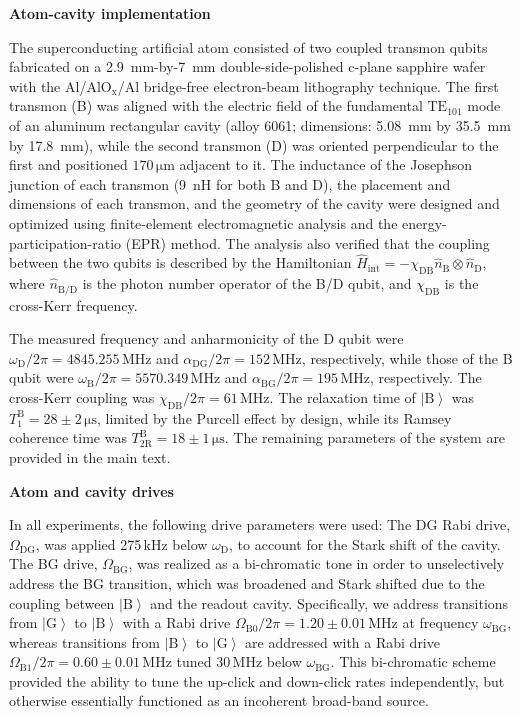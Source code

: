 \documentclass[
	 			preprint,     		superscriptaddress, 																longbibliography,
		amsmath, amssymb,
		aps,  prb,   		floatfix,
		linenumbers     
	]{revtex4-1}
\newcommand{\ket}[1]{\left|#1\right>}
\begin{document}
\textbf{Atom-cavity implementation}

The superconducting artificial atom consisted of two coupled transmon qubits fabricated on a 2.9~mm-by-7~mm double-side-polished  c-plane sapphire wafer with the Al/Al$\text{O}_\text{x}$/Al bridge-free electron-beam lithography technique. 
The first transmon (B) was aligned with the electric field of the fundamental $\mathrm{TE}_\mathrm{101}$ mode of an aluminum rectangular cavity (alloy 6061; dimensions: 5.08~mm by 35.5~mm by 17.8~mm), while the second transmon (D) was oriented perpendicular to the first and  positioned $170\,\mathrm{\mu m}$ adjacent to it.
The inductance of the Josephson junction of each transmon (9~nH for both B and D), the placement and dimensions of each transmon, and the geometry of the cavity were designed and optimized using finite-element electromagnetic analysis and the energy-participation-ratio (EPR) method. The analysis also verified that the coupling  between the two qubits is described by the Hamiltonian $\hat{H}_\mathrm{int} = -\chi_\mathrm{DB} \hat{n}_\mathrm{B} \otimes  \hat{n}_\mathrm{D}$, where $\hat{n}_\mathrm{B/D}$ is the photon number operator of the B/D qubit, and  $\chi_\mathrm{DB}$ is the cross-Kerr frequency. 

The measured frequency and anharmonicity of the D qubit were $\omega_\mathrm{D}/2\pi = 4845.255\,\mathrm{MHz}$ and  $\alpha_\mathrm{DG}/2\pi = 152\,\mathrm{MHz}  $, respectively, while those of the B qubit were $\omega_\mathrm{B}/2\pi = 5570.349 \,\mathrm{MHz}$ and $\alpha_\mathrm{BG}/2\pi = 195 \,\mathrm{MHz}$, respectively. 
The cross-Kerr coupling was $\chi_\mathrm{DB} /2\pi = 61\,\mathrm{MHz}$.
The relaxation time of  $\ket{\mathrm{B}}$  was $T_\mathrm{1}^{\mathrm{B}} =28 \pm 2\, \mathrm{\mu s}$, limited by the Purcell effect by design, while its Ramsey coherence time was  $T_\mathrm{2R}^\mathrm{B} =  18\pm1\, \mathrm{\mu s}$.
The remaining parameters of the system are provided in the main text. 


\textbf{Atom and cavity drives} 

In all experiments, the following drive parameters were used: 
The DG Rabi drive, $\Omega_\mathrm{DG}$, was applied 275\,kHz below $\omega_\mathrm{D}$, to account for the Stark shift of the cavity. 
The BG drive, $\Omega_\mathrm{BG}$, was realized as a bi-chromatic tone in order to unselectively address the BG transition, which was broadened and Stark shifted due to the coupling between $\ket{\mathrm{B}}$ and the readout cavity. 
Specifically, we address transitions from $\ket{\mathrm{G}}$ to $\ket{\mathrm{B}}$ with a Rabi drive $\Omega_\mathrm{B0}/2\pi = 1.20\pm0.01\,$MHz at frequency $\omega_\mathrm{BG}$, whereas transitions from $\ket{\mathrm{B}}$ to $\ket{\mathrm{G}}$ are addressed with a Rabi drive $\Omega_\mathrm{B1}/2\pi = 0.60\pm0.01\,$MHz tuned 30\,MHz below $\omega_\mathrm{BG}$. This bi-chromatic scheme provided the ability to tune the up-click and down-click rates independently, but otherwise essentially functioned as an incoherent broad-band source. 
\end{document}
